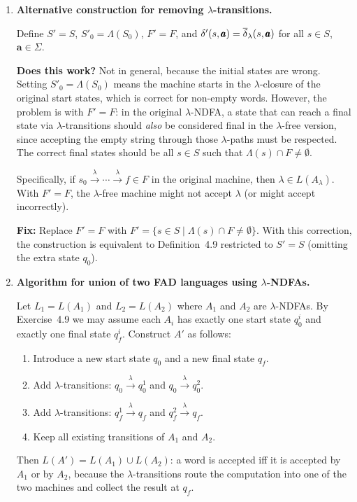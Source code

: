 \begin{enumerate}[{4.}1.]
\textbf{Conclusion.}  Yes, part (ii) can be derived from parts (i) and (iii).
It is included explicitly to make the base case of inductive proofs more
transparent, but it is logically redundant.

\item \textbf{Alternative construction for removing $\lambda$-transitions.}

Define $S'=S$, $S'_0=\Lambda(S_0)$, $F'=F$, and
$\delta'(s,\pmb{a})=\overline{\delta}_{\lambda}(s,\pmb{a})$ for all $s\in S$, $\pmb{a}\in\Sigma$.

\textbf{Does this work?}  Not in general, because the initial states are wrong.
Setting $S'_0=\Lambda(S_0)$ means the machine starts in the $\lambda$-closure
of the original start states, which is correct for non-empty words.  However, the
problem is with $F'=F$: in the original $\lambda$-NDFA, a state that can reach a
final state via $\lambda$-transitions should \emph{also} be considered final in
the $\lambda$-free version, since accepting the empty string through those
$\lambda$-paths must be respected.  The correct final states should be all
$s\in S$ such that $\Lambda(s)\cap F\neq\emptyset$.

Specifically, if $s_0\xrightarrow{\lambda}\cdots\xrightarrow{\lambda}f\in F$ in
the original machine, then $\lambda\in L(A_\lambda)$.  With $F'=F$, the
$\lambda$-free machine might not accept $\lambda$ (or might accept incorrectly).

\textbf{Fix:}  Replace $F'=F$ with $F'=\{s\in S\mid\Lambda(s)\cap F\neq\emptyset\}$.
With this correction, the construction is equivalent to Definition~4.9 restricted
to $S'=S$ (omitting the extra state $q_0$).

\item \textbf{Algorithm for union of two FAD languages using $\lambda$-NDFAs.}

Let $L_1=L(A_1)$ and $L_2=L(A_2)$ where $A_1$ and $A_2$ are $\lambda$-NDFAs.
By Exercise~4.9 we may assume each $A_i$ has exactly one start state $q^i_0$ and
exactly one final state $q^i_f$.  Construct $A'$ as follows:
\begin{enumerate}[(1)]
  \item Introduce a new start state $q_0$ and a new final state $q_f$.
  \item Add $\lambda$-transitions: $q_0\xrightarrow{\lambda}q^1_0$ and
        $q_0\xrightarrow{\lambda}q^2_0$.
  \item Add $\lambda$-transitions: $q^1_f\xrightarrow{\lambda}q_f$ and
        $q^2_f\xrightarrow{\lambda}q_f$.
  \item Keep all existing transitions of $A_1$ and $A_2$.
\end{enumerate}
Then $L(A')=L(A_1)\cup L(A_2)$: a word is accepted iff it is accepted by $A_1$
or by $A_2$, because the $\lambda$-transitions route the computation into one
of the two machines and collect the result at $q_f$.


\end{enumerate}
